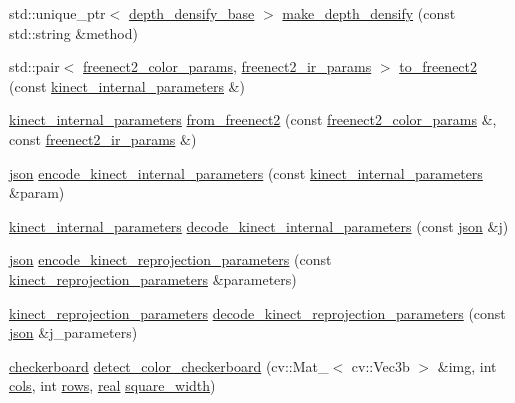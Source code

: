 \begin{DoxyCompactItemize}
\item 
std\+::unique\+\_\+ptr$<$ \hyperlink{classtlz_1_1depth__densify__base}{depth\+\_\+densify\+\_\+base} $>$ \hyperlink{namespacetlz_a91d341001d1d4c6e2e464c33493a646f}{make\+\_\+depth\+\_\+densify} (const std\+::string \&method)
\item 
std\+::pair$<$ \hyperlink{namespacetlz_a5c4bcd0a7cbf071e65a2a4fc68850282}{freenect2\+\_\+color\+\_\+params}, \hyperlink{namespacetlz_af1f29fddd4d7619e1c21a8a532ff67ef}{freenect2\+\_\+ir\+\_\+params} $>$ \hyperlink{namespacetlz_a6f3975e223ba94b96abba39598db17af}{to\+\_\+freenect2} (const \hyperlink{structtlz_1_1kinect__internal__parameters}{kinect\+\_\+internal\+\_\+parameters} \&)
\item 
\hyperlink{structtlz_1_1kinect__internal__parameters}{kinect\+\_\+internal\+\_\+parameters} \hyperlink{namespacetlz_a0ede2d330085f92d43866ec94102f871}{from\+\_\+freenect2} (const \hyperlink{namespacetlz_a5c4bcd0a7cbf071e65a2a4fc68850282}{freenect2\+\_\+color\+\_\+params} \&, const \hyperlink{namespacetlz_af1f29fddd4d7619e1c21a8a532ff67ef}{freenect2\+\_\+ir\+\_\+params} \&)
\item 
\hyperlink{namespacetlz_ac400657dfcddf6309a769aefc23eed0c}{json} \hyperlink{namespacetlz_a411d4a181eea862f9d9a6c23174512bc}{encode\+\_\+kinect\+\_\+internal\+\_\+parameters} (const \hyperlink{structtlz_1_1kinect__internal__parameters}{kinect\+\_\+internal\+\_\+parameters} \&param)
\item 
\hyperlink{structtlz_1_1kinect__internal__parameters}{kinect\+\_\+internal\+\_\+parameters} \hyperlink{namespacetlz_a23ae826b33c7d428c32ce1bf2e6b1630}{decode\+\_\+kinect\+\_\+internal\+\_\+parameters} (const \hyperlink{namespacetlz_ac400657dfcddf6309a769aefc23eed0c}{json} \&j)
\item 
\hyperlink{namespacetlz_ac400657dfcddf6309a769aefc23eed0c}{json} \hyperlink{namespacetlz_a509bd15737c6ed2aec28c4f7039d1b35}{encode\+\_\+kinect\+\_\+reprojection\+\_\+parameters} (const \hyperlink{structtlz_1_1kinect__reprojection__parameters}{kinect\+\_\+reprojection\+\_\+parameters} \&parameters)
\item 
\hyperlink{structtlz_1_1kinect__reprojection__parameters}{kinect\+\_\+reprojection\+\_\+parameters} \hyperlink{namespacetlz_ad5e7c69f85c8a3b9aad1bd4aeb551148}{decode\+\_\+kinect\+\_\+reprojection\+\_\+parameters} (const \hyperlink{namespacetlz_ac400657dfcddf6309a769aefc23eed0c}{json} \&j\+\_\+parameters)
\item 
\hyperlink{structtlz_1_1checkerboard}{checkerboard} \hyperlink{namespacetlz_addbb2acf9d24eda4bf25536c55ae84d8}{detect\+\_\+color\+\_\+checkerboard} (cv\+::\+Mat\+\_\+$<$ cv\+::\+Vec3b $>$ \&img, int \hyperlink{checkerboard__samples_8cc_a4407a60bc4387adae24cee658711f2d9}{cols}, int \hyperlink{checkerboard__samples_8cc_a061459acc9e078fa4699e0e349887215}{rows}, \hyperlink{namespacetlz_a15fd37cce97f2b8b606af18c2615f602}{real} \hyperlink{checkerboard__samples_8cc_ac9c5e9ae84febda1283c11202619c086}{square\+\_\+width})

\end{DoxyCompactItemize}
